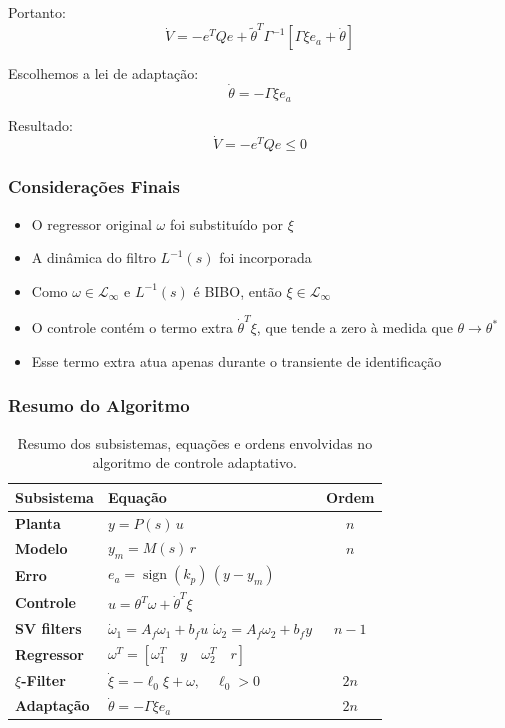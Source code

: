 \documentclass[10pt]{article}
\begin{document}
Portanto:
\[
\dot{V} = -e^T Q e + \tilde{\theta}^T \Gamma^{-1} [ \Gamma \xi e_a+ \dot{\theta}]
\]

Escolhemos a lei de adaptação:
\[
\dot{\theta} = -\Gamma \xi e_a
\]

Resultado:
\[
\dot{V} = -e^T Q e \leq 0
\]

\subsubsection{Considerações Finais}

\begin{itemize}
  \item O regressor original \( \omega \) foi substituído por \( \xi \)
  \item A dinâmica do filtro \( L^{-1}(s) \) foi incorporada
  \item Como \( \omega \in \mathcal{L}_\infty \) e \( L^{-1}(s) \) é BIBO, então \( \xi \in \mathcal{L}_\infty \)
  \item O controle contém o termo extra \( \dot{\theta}^T \xi \), que tende a zero à medida que \( \theta \to \theta^* \)
  \item Esse termo extra atua apenas durante o transiente de identificação
\end{itemize}

\subsubsection{Resumo do Algoritmo}

\begin{table}[htbp]
\centering
\renewcommand{\arraystretch}{1.4}
\begin{tabular}{|>{\bfseries}m{3cm}|m{8cm}|c|}
\hline
\textbf{Subsistema} & \textbf{Equação} & \textbf{Ordem} \\
\hline
Planta & $y = P(s)\, u$ & $n$ \\
\hline
Modelo & $y_m = M(s)\, r$ & $n$ \\
\hline
Erro & $e_a = \operatorname{sign}(k_p)\, (y - y_m)$ & \\
\hline
Controle & $u = \theta^T \omega + \dot{\theta}^T \xi $ & \\
\hline
SV filters & $\dot{\omega}_1 = A_f \omega_1 + b_f u$ \newline $\dot{\omega}_2 = A_f \omega_2 + b_f y$ & $n - 1$ \\
\hline
Regressor & $\omega^T = \left[ \omega_1^T \quad y \quad \omega_2^T \quad r \right]$ & \\
\hline
$\xi$-Filter & $\dot{\xi} = - \ell_0 \xi + \omega, \quad \ell_0 > 0$ & $2n$ \\
\hline
Adaptação & $\dot{\theta} = -\Gamma \xi e_a$ & $2n$ \\
\hline
\end{tabular}
\caption{Resumo dos subsistemas, equações e ordens envolvidas no algoritmo de controle adaptativo.}
\label{tab:resumo_algoritmo2}
\end{table}
\end{document}
